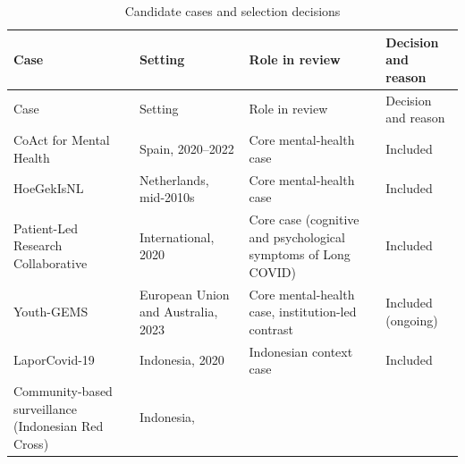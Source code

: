 \documentclass[
  number,
  preprint]{elsarticle}
\begin{document}
\begin{longtable}[]{@{}
  >{\raggedright\arraybackslash}p{}
  >{\raggedright\arraybackslash}p{}
  >{\raggedright\arraybackslash}p{}
  >{\raggedright\arraybackslash}p{}@{}}
\caption[]{Candidate cases and selection
decisions}\label{tbl-cases}\tabularnewline
\toprule\noalign{}
\begin{minipage}[b]{\linewidth}\raggedright
Case
\end{minipage} & \begin{minipage}[b]{\linewidth}\raggedright
Setting
\end{minipage} & \begin{minipage}[b]{\linewidth}\raggedright
Role in review
\end{minipage} & \begin{minipage}[b]{\linewidth}\raggedright
Decision and reason
\end{minipage} \\
\midrule\noalign{}
\endfirsthead
\toprule\noalign{}
\begin{minipage}[b]{\linewidth}\raggedright
Case
\end{minipage} & \begin{minipage}[b]{\linewidth}\raggedright
Setting
\end{minipage} & \begin{minipage}[b]{\linewidth}\raggedright
Role in review
\end{minipage} & \begin{minipage}[b]{\linewidth}\raggedright
Decision and reason
\end{minipage} \\
\midrule\noalign{}
\endhead
\bottomrule\noalign{}
\endlastfoot
CoAct for Mental Health & Spain, 2020--2022 & Core mental-health case &
Included \\
HoeGekIsNL & Netherlands, mid-2010s & Core mental-health case &
Included \\
Patient-Led Research Collaborative & International, 2020 & Core case
(cognitive and psychological symptoms of Long COVID) & Included \\
Youth-GEMS & European Union and Australia, 2023 & Core mental-health
case, institution-led contrast & Included (ongoing) \\
LaporCovid-19 & Indonesia, 2020 & Indonesian context case & Included \\
Community-based surveillance (Indonesian Red Cross) & Indonesia,

\end{longtable}
\end{document}
